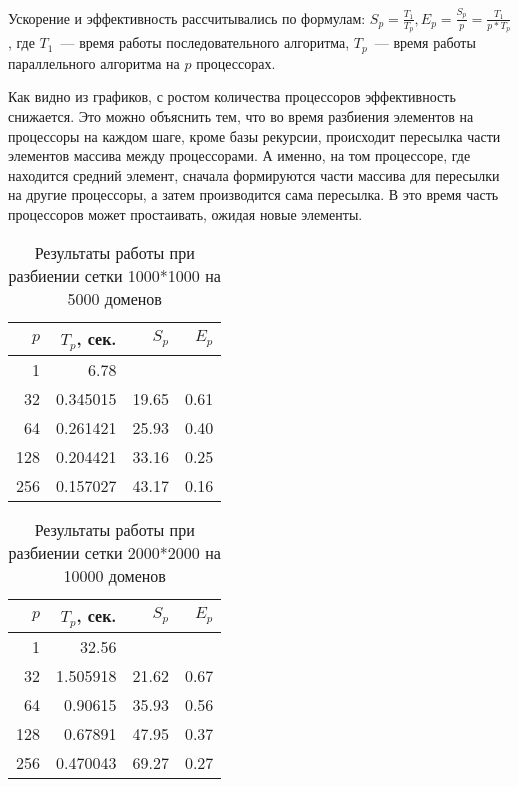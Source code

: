 \documentclass[oneside,final,14pt]{extreport}
\begin{document}
Ускорение и эффективность рассчитывались по формулам:
$S_p = \frac{T_1}{T_p}, E_p = \frac{S_p}{p} = \frac{T_1}{p * T_p}$, где
$T_1$~--- время работы последовательного алгоритма,
$T_p$~--- время работы параллельного алгоритма на $p$ процессорах.

Как видно из графиков, с ростом количества процессоров эффективность снижается.
Это можно объяснить тем, что во время разбиения элементов на процессоры на каждом
шаге, кроме базы рекурсии, происходит пересылка части элементов массива
между процессорами. А именно, на том процессоре, где находится средний элемент,
сначала формируются части массива для пересылки на другие процессоры, а затем
производится сама пересылка. В это время часть процессоров может простаивать,
ожидая новые элементы.

\begin{table}[h]
\centering
\begin{tabular}{|r|r|r|r|}\hline
$p$    & $T_p$, сек. & $S_p$ & $E_p$ \\ \hline
1      & 6.78        &       &       \\ \hline
32     & 0.345015    & 19.65 & 0.61  \\ \hline
64     & 0.261421    & 25.93 & 0.40  \\ \hline
128    & 0.204421    & 33.16 & 0.25  \\ \hline
256    & 0.157027    & 43.17 & 0.16  \\ \hline
\end{tabular}
\caption{Результаты работы при разбиении сетки 1000*1000 на 5000 доменов}
\label{tab1000}
\end{table}

\begin{table}[h]
\centering
\begin{tabular}{|r|r|r|r|}\hline
$p$    & $T_p$, сек. & $S_p$ & $E_p$ \\ \hline
1      & 32.56       &       &       \\ \hline
32     & 1.505918    & 21.62 & 0.67  \\ \hline
64     & 0.90615     & 35.93 & 0.56  \\ \hline
128    & 0.67891     & 47.95 & 0.37  \\ \hline
256    & 0.470043    & 69.27 & 0.27  \\ \hline
\end{tabular}
\caption{Результаты работы при разбиении сетки 2000*2000 на 10000 доменов}
\label{tab2000}
\end{table}
\end{document}
